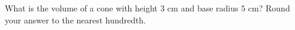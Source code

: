 What is the volume of a cone with height $3$ cm and base radius $5$ cm? Round your answer to the nearest hundredth.
